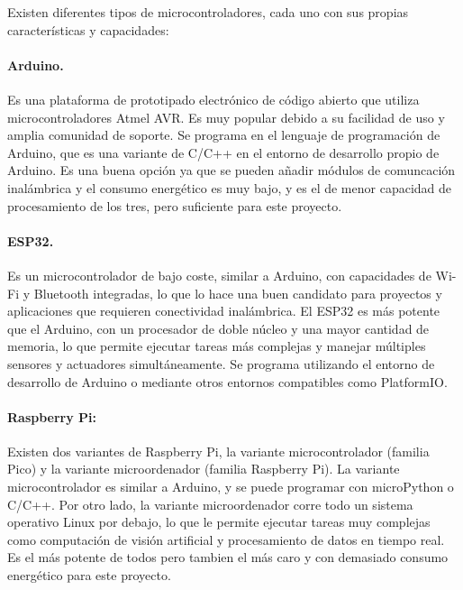 Existen diferentes tipos de microcontroladores, cada uno con sus propias características y capacidades:

\paragraph{Arduino.}
Es una plataforma de prototipado electrónico de código 
abierto que utiliza microcontroladores Atmel AVR. Es muy popular 
debido a su facilidad de uso y amplia comunidad de soporte. Se programa
en el lenguaje de programación de Arduino, que es una variante de C/C++ en el
entorno de desarrollo propio de Arduino. Es una buena opción ya que se pueden
añadir módulos de comuncación inalámbrica y el consumo energético es muy
bajo, y es el de menor capacidad de procesamiento de los tres, pero suficiente para 
este proyecto.


\paragraph{ESP32.}
Es un microcontrolador de bajo coste, similar a Arduino, con capacidades de Wi-Fi y 
Bluetooth integradas, lo que lo hace una buen candidato para proyectos y aplicaciones 
que requieren conectividad inalámbrica. El ESP32 es más potente que el Arduino, con 
un procesador de doble núcleo y una mayor cantidad de memoria, lo que permite 
ejecutar tareas más complejas y manejar múltiples sensores y actuadores simultáneamente. 
Se programa utilizando el entorno de desarrollo de Arduino o mediante otros entornos 
compatibles como PlatformIO.

\paragraph{Raspberry Pi:}
Existen dos variantes de Raspberry Pi, la variante microcontrolador (familia Pico)
y la variante microordenador (familia Raspberry Pi). La variante microcontrolador es similar a Arduino,
y se puede programar con microPython o C/C++. Por otro lado, la variante microordenador corre todo un 
sistema operativo Linux por debajo, lo que le permite ejecutar tareas muy complejas como
computación de visión artificial y procesamiento de datos en tiempo real. Es el más potente de todos
pero tambien el más caro y con demasiado consumo energético para este proyecto.


